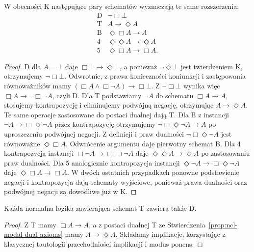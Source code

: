 \begin{stwierdzenie}
\label{prop:ncl-modal-dual-axioms}
W obecności K następujące pary schematów
wyznaczają te same rozszerzenia:
\[
\begin{array}{c|l}
 \mathrm D & \neg\Box\bot\\
 \mathrm T & A\to\Diamond A\\
 \mathrm B & \Diamond\Box A\to A\\
 4 & \Diamond\Diamond A\to\Diamond A\\
 5 & \Diamond\Box A\to\Box A .
\end{array}
\]
\end{stwierdzenie}
\begin{proof}
D dla $A=\bot$ daje $\Box\bot\to\Diamond\bot$,
a ponieważ $\neg\Diamond\bot$ jest twierdzeniem K,
otrzymujemy $\neg\Box\bot$.
Odwrotnie, z prawa konieczności koniunkcji i
zastępowania równoważników mamy
$(\Box A\wedge\Box\neg A)\to\Box\bot$.
Z $\neg\Box\bot$ wynika więc
$\Box A\to\neg\Box\neg A$, czyli D.
Dla T podstawiamy $\neg A$ do schematu
$\Box A\to A$, stosujemy kontrapozycję i
eliminujemy podwójną negację, otrzymując
$A\to\Diamond A$. Te same operacje zastosowane
do postaci dualnej dają T.
Dla B z instancji
$\neg A\to\Box\Diamond\neg A$ przez
kontrapozycję otrzymujemy
$\neg\Box\Diamond\neg A\to A$ po uproszczeniu
podwójnej negacji. Z definicji i praw dualności
$\neg\Box\Diamond\neg A$ jest równoważne
$\Diamond\Box A$. Odwrócenie argumentu
daje pierwotny schemat B.
Dla 4 kontrapozycja instancji
$\Box\neg A\to\Box\Box\neg A$ daje
$\Diamond\Diamond A\to\Diamond A$
po zastosowaniu praw dualności.
Dla 5 analogicznie kontrapozycja instancji
$\Diamond\neg A\to\Box\Diamond\neg A$
daje $\Diamond\Box A\to\Box A$.
W dwóch ostatnich przypadkach ponowne
podstawienie negacji i kontrapozycja dają
schematy wyjściowe, ponieważ prawa dualności
oraz podwójnej negacji są dowodliwe już w K.
\end{proof}

\begin{wniosek}
\label{cor:ncl-modal-T-implies-D}
Każda normalna logika zawierająca schemat T
zawiera także D.
\end{wniosek}
\begin{proof}
Z T mamy $\Box A\to A$, a z postaci dualnej T
ze Stwierdzenia~\ref{prop:ncl-modal-dual-axioms}
mamy $A\to\Diamond A$. Składamy implikacje,
korzystając z klasycznej tautologii przechodniości
implikacji i modus ponens.
\end{proof}

